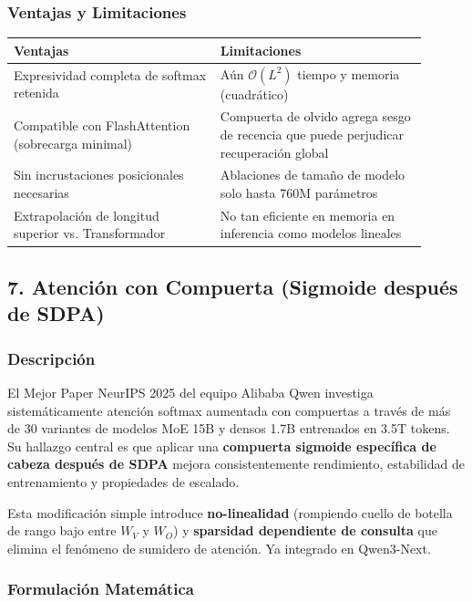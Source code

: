 \documentclass[11pt,a4paper]{article}
\begin{document}
\subsubsection{Ventajas y Limitaciones}

\begin{table}[h]
\centering
\begin{tabular}{|p{0.45\linewidth}|p{0.45\linewidth}|}
\hline
\textbf{Ventajas} & \textbf{Limitaciones} \\
\hline
Expresividad completa de softmax retenida & Aún $\mathcal{O}(L^2)$ tiempo y memoria (cuadrático) \\
\hline
Compatible con FlashAttention (sobrecarga minimal) & Compuerta de olvido agrega sesgo de recencia que puede perjudicar recuperación global \\
\hline
Sin incrustaciones posicionales necesarias & Ablaciones de tamaño de modelo solo hasta 760M parámetros \\
\hline
Extrapolación de longitud superior vs. Transformador & No tan eficiente en memoria en inferencia como modelos lineales \\
\hline
\end{tabular}
\end{table}

\subsection{7. Atención con Compuerta (Sigmoide después de SDPA)}

\subsubsection{Descripción}

El Mejor Paper NeurIPS 2025 del equipo Alibaba Qwen investiga sistemáticamente atención softmax aumentada con compuertas a través de más de 30 variantes de modelos MoE 15B y densos 1.7B entrenados en 3.5T tokens. Su hallazgo central es que aplicar una \textbf{compuerta sigmoide específica de cabeza después de SDPA} mejora consistentemente rendimiento, estabilidad de entrenamiento y propiedades de escalado.

Esta modificación simple introduce \textbf{no-linealidad} (rompiendo cuello de botella de rango bajo entre $W_V$ y $W_O$) y \textbf{sparsidad dependiente de consulta} que elimina el fenómeno de sumidero de atención. Ya integrado en Qwen3-Next.

\subsubsection{Formulación Matemática}
\end{document}
